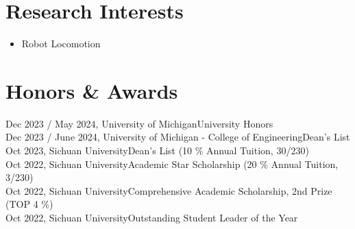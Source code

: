 \documentclass[letter,12pt]{article}
\begin{document}


\section{Research Interests}

\begin{itemize}
    \item{Robot Locomotion}
\end{itemize}

\section{Honors \& Awards}
Dec 2023 / May 2024, University of Michigan\hfill University Honors\\
Dec 2023 / June 2024, University of Michigan - College of Engineering\hfill Dean's List\\
Oct 2023, Sichuan University\hfill Dean's List (10 \% Annual Tuition, 30/230)\\
Oct 2022, Sichuan University\hfill Academic Star Scholarship (20 \% Annual Tuition, 3/230)\\
Oct 2022, Sichuan University\hfill Comprehensive Academic Scholarship, 2nd Prize (TOP 4 \%)\\
Oct 2022, Sichuan University\hfill Outstanding Student Leader of the Year\\
\end{document}
